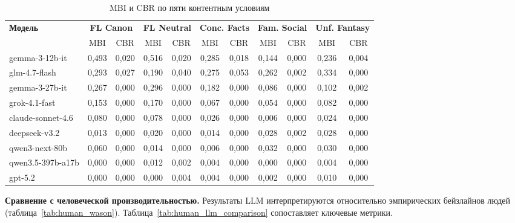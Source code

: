 \begin{table}[h!]
\caption{MBI и CBR по пяти контентным условиям}
\label{tab:wst_bias}
\centering
\begin{tabular}{|l|cc|cc|cc|cc|cc|}
\hline
\multirow{2}{*}{\textbf{Модель}} & \multicolumn{2}{c|}{\textbf{FL Canon}} & \multicolumn{2}{c|}{\textbf{FL Neutral}} & \multicolumn{2}{c|}{\textbf{Conc. Facts}} & \multicolumn{2}{c|}{\textbf{Fam. Social}} & \multicolumn{2}{c|}{\textbf{Unf. Fantasy}} \\
\cline{2-11}
 & MBI & CBR & MBI & CBR & MBI & CBR & MBI & CBR & MBI & CBR \\
\hline
gemma-3-12b-it    & 0,493 & 0,020 & 0,516 & 0,020 & 0,285 & 0,018 & 0,144 & 0,000 & 0,236 & 0,004 \\
glm-4.7-flash     & 0,293 & 0,027 & 0,190 & 0,040 & 0,275 & 0,053 & 0,262 & 0,002 & 0,334 & 0,000 \\
gemma-3-27b-it    & 0,267 & 0,000 & 0,296 & 0,000 & 0,182 & 0,000 & 0,086 & 0,000 & 0,102 & 0,002 \\
grok-4.1-fast     & 0,153 & 0,000 & 0,170 & 0,000 & 0,067 & 0,000 & 0,054 & 0,000 & 0,082 & 0,000 \\
claude-sonnet-4.6 & 0,080 & 0,000 & 0,078 & 0,000 & 0,026 & 0,000 & 0,006 & 0,000 & 0,024 & 0,000 \\
deepseek-v3.2     & 0,013 & 0,000 & 0,020 & 0,000 & 0,014 & 0,000 & 0,028 & 0,002 & 0,028 & 0,000 \\
qwen3-next-80b    & 0,060 & 0,000 & 0,014 & 0,000 & 0,006 & 0,000 & 0,032 & 0,000 & 0,030 & 0,000 \\
qwen3.5-397b-a17b & 0,000 & 0,000 & 0,012 & 0,002 & 0,004 & 0,000 & 0,000 & 0,000 & 0,004 & 0,000 \\
gpt-5.2           & 0,000 & 0,000 & 0,000 & 0,004 & 0,004 & 0,000 & 0,002 & 0,000 & 0,010 & 0,000 \\
\hline
\end{tabular}
\end{table}

\textbf{Сравнение с человеческой производительностью.} Результаты LLM интерпретируются относительно эмпирических бейзлайнов людей (таблица~\ref{tab:human_wason}). Таблица~\ref{tab:human_llm_comparison} сопоставляет ключевые метрики.

